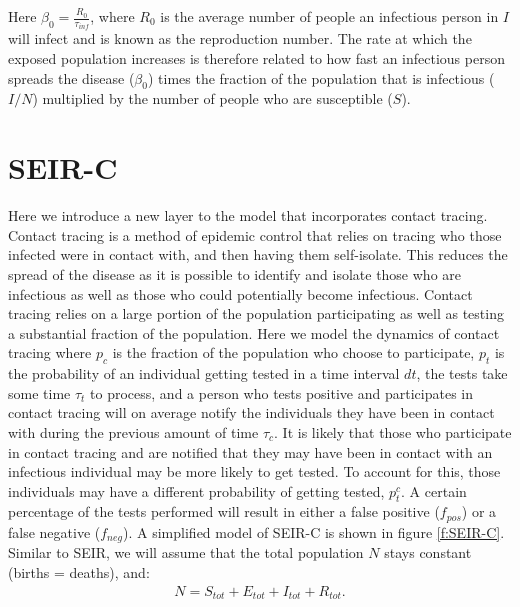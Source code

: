 \documentclass[notitlepage, superscriptaddress]{revtex4-2}
\begin{document}
Here $\beta_0 = \frac{R_{0}}{\tau_{inf}}$, where $R_{0}$ is the average number of people an infectious person in $I$ will infect and is known as the reproduction number. The rate at which the exposed population increases is therefore related to how fast an infectious person spreads the disease ($\beta_{0}$) times the fraction of the population that is infectious ($I/N$) multiplied by the number of people who are susceptible ($S$).

\section{SEIR-C}

Here we introduce a new layer to the model that incorporates contact tracing. Contact tracing is a method of epidemic control that relies on tracing who those infected were in contact with, and then having them self-isolate. This reduces the spread of the disease as it is possible to identify and isolate those who are infectious as well as those who could potentially become infectious. Contact tracing relies on a large portion of the population participating as well as testing a substantial fraction of the population. Here we model the dynamics of contact tracing where $p_{c}$ is the fraction of the population who choose to participate, $p_t$ is the probability of an individual getting tested in a time interval $dt$, the tests take some time $\tau_{t}$ to process, and a person who tests positive and participates in contact tracing will on average notify the individuals they have been in contact with during the previous amount of time $\tau_{c}$. It is likely that those who participate in contact tracing and are notified that they may have been in contact with an infectious individual may be more likely to get tested. To account for this, those individuals may have a different probability of getting tested, $p^{c}_{t}$. A certain percentage of the tests performed will result in either a false positive ($f_{pos}$) or a false negative ($f_{neg}$). A simplified model of SEIR-C is shown in figure \ref{f:SEIR-C}. Similar to SEIR, we will assume that the total population $N$ stays constant (births = deaths), and:
\begin{eqnarray}
\label{E:SEIRPop_c}
N = S_{tot} + E_{tot} + I_{tot} + R_{tot}.
\end{eqnarray}
\end{document}
